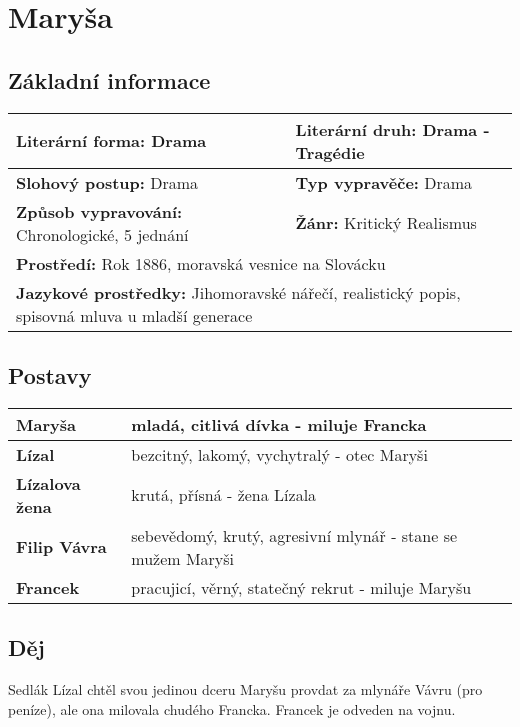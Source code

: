 \section{Maryša}
\subsection*{Základní informace}
\begin{tabularx}{\linewidth}{l|l}
    \textbf{Literární forma:} Drama                       & \textbf{Literární druh:} Drama - Tragédie                          \\
    \hline
    \textbf{Slohový postup:} Drama                        & \textbf{Typ vypravěče:} Drama                                      \\
    \hline
    \textbf{Způsob vypravování:} Chronologické, 5 jednání & \textbf{Žánr:} Kritický Realismus                                  \\
    \hline
    \multicolumn{2}{l}{\textbf{Prostředí:} Rok 1886, moravská vesnice na Slovácku}                                             \\
    \hline
    \multicolumn{2}{l}{\textbf{Jazykové prostředky:} Jihomoravské nářečí, realistický popis, spisovná mluva u mladší generace} \\
\end{tabularx}
\subsection*{Postavy}
\begin{tabularx}{\linewidth}{l|l}
    \textbf{Maryša}        & mladá, citlivá dívka - miluje Francka                       \\
    \hline
    \textbf{Lízal}         & bezcitný, lakomý, vychytralý - otec Maryši                  \\
    \hline
    \textbf{Lízalova žena} & krutá, přísná - žena Lízala                                 \\
    \hline
    \textbf{Filip Vávra}   & sebevědomý, krutý, agresivní mlynář - stane se mužem Maryši \\
    \hline
    \textbf{Francek}       & pracujicí, věrný, statečný rekrut - miluje Maryšu           \\
\end{tabularx}
\subsection*{Děj}
Sedlák Lízal chtěl svou jedinou dceru Maryšu provdat za mlynáře Vávru (pro peníze), ale ona milovala chudého Francka.
Francek je odveden na vojnu.

